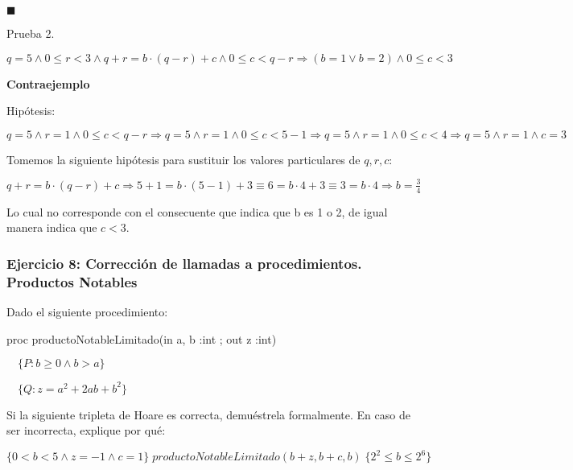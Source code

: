 \documentclass[hidelinks]{article}
\begin{document}
$\blacksquare$ \par

Prueba 2. \par

$q=5 \land 0 \leq r < 3 \land q + r = b \cdot (q - r) + c \land 0 \leq c < q - r \Rightarrow (b = 1 \lor b = 2) \land 0 \leq c < 3$ \par

\textbf{Contraejemplo} \par

Hipótesis: \par
$q=5 \land r=1 \land 0 \leq c < q-r \Rightarrow q=5 \land r=1 \land 0 \leq c < 5-1 \Rightarrow q=5 \land r=1 \land 0 \leq c < 4 \Rightarrow q=5 \land r=1 \land c=3$ \par

Tomemos la siguiente hipótesis para sustituir los valores particulares de
$q,r,c$: \par
$q + r = b \cdot (q - r) + c \Rightarrow 5 + 1 = b \cdot (5 - 1) + 3 \equiv 6 = b \cdot 4 + 3 \equiv 3 = b \cdot 4 \Rightarrow b = \frac{3}{4}$ \par

Lo cual no corresponde con el consecuente que indica que b es 1 o 2, de igual
manera indica que $c < 3$. \par

\newpage


\subsubsection{Ejercicio 8: Corrección de llamadas a procedimientos. Productos Notables}

Dado el siguiente procedimiento: \par

proc productoNotableLimitado(in a, b :int ; out z :int) \par
$\quad \{P: b \geq 0 \land b > a\}$ \par
$\quad \{Q: z = a^2 + 2ab +b^2\}$ \par

Si la siguiente tripleta de Hoare es correcta, demuéstrela formalmente. En caso
de ser incorrecta, explique por qué:\par

$\{ 0 < b < 5 \land z = -1 \land c = 1 \} \; productoNotableLimitado(b + z, b + c, b) \; \{ 2^2 \leq b \leq 2^6 \}$ \par
\end{document}
